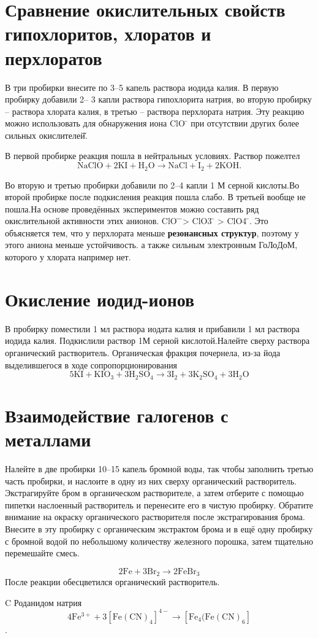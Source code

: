 \documentclass[a4paper,12pt]{article}
\begin{document}
\section{Сравнение окислительных свойств гипохлоритов, хлоратов и перхлоратов}
В три пробирки внесите по 3–5 капель раствора иодида калия. В первую пробирку добавили 2–
3 капли раствора гипохлорита натрия, во вторую пробирку – раствора хлората калия, в третью –
раствора перхлората натрия.  Эту реакцию можно использовать для обнаружения иона ClO ̄ при отсутствии других более
сильных окислителей̆.


В первой пробирке реакция пошла в нейтральных условиях. Раствор пожелтел
\begin{equation} 
\mathrm{NaClO + 2KI + H_2O \longrightarrow NaCl + I_2 + 2KOH. } 
\end{equation}

 Во вторую и третью пробирки добавили по 2–4 капли 1 М серной кислоты.Во второй пробирке после подкисления реакция пошла слабо. В третьей вообще не пошла.На основе проведённых экспериментов можно составить ряд окислительной активности этих анионов.  ClO ̄ ̄> ClO3 ̄ > ClO4 ̄. Это объясняется тем, что у перхлората меньше \textbf{резонансных структур}, поэтому у этого аниона меньше устойчивость. а также сильным электронным ГоЛоДоМ, которого у хлората например нет.
\section{Окисление иодид-ионов}
В пробирку поместили 1 мл раствора иодата калия и прибавили 1 мл раствора иодида калия.
Подкислили раствор 1М серной кислотой.Налейте
сверху раствора органический растворитель. Органическая фракция почернела, из-за йода выделившегося в ходе сопропорционирования
\begin{equation} 
\mathrm{5KI + KIO_3 + 3H_2SO_4 \longrightarrow 3I_2 + 3K_2SO_4 + 3H_2O } 
\end{equation}
\section{Взаимодействие галогенов с металлами}
Налейте в две пробирки 10–15 капель бромной воды, так чтобы заполнить третью часть
пробирки, и наслоите в одну из них сверху органический растворитель. Экстрагируйте бром в
органическом растворителе, а затем отберите с помощью пипетки наслоенный растворитель и
перенесите его в чистую пробирку. Обратите внимание на окраску органического растворителя
после экстрагирования брома. Внесите в эту пробирку с органическим экстрактом брома и в ещё
одну пробирку с бромной водой по небольшому количеству железного порошка, затем тщательно
перемешайте смесь. 

\begin{equation} 
\mathrm{2Fe + 3Br_2 \longrightarrow 2FeBr_3 } 
\end{equation}
После реакции обесцветился органический растворитель.



C Роданидом натрия
\begin{equation} 
\mathrm{4Fe^{3+}+3[Fe(CN)_4]^{4-}  \longrightarrow [Fe_4(Fe(CN)_6] } 
\end{equation}
.
\end{document}
